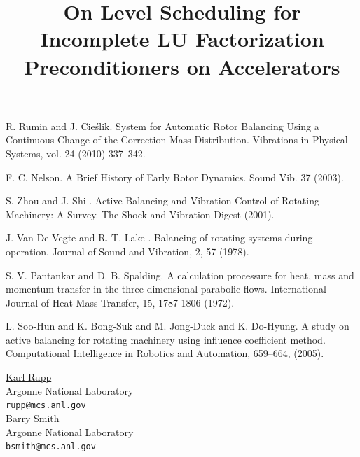 \documentclass[article, A4, 11pt]{llncs}%
\begin{document}


\begin{thebibliography}{10}
{\sc R. Rumin and J. Cieślik}. {System for Automatic Rotor Balancing Using a Continuous Change of the Correction Mass Distribution}. Vibrations in Physical Systems, vol. 24 (2010) 337–342.

{\sc F. C. Nelson}. {A Brief History of Early Rotor Dynamics}. Sound Vib. 37 (2003).

{\sc S. Zhou and J. Shi }. {Active Balancing and Vibration Control of Rotating Machinery: A Survey}. The Shock and Vibration Digest (2001).

{\sc  J. Van De Vegte and R. T. Lake }. {Balancing of rotating systems during operation}. Journal of Sound and Vibration, 2, 57 (1978).

{\sc S. V. Pantankar and D. B. Spalding}. {A calculation processure for heat, mass and momentum transfer in the three-dimensional parabolic flows}. International Journal of Heat Mass Transfer, 15, 1787-1806 (1972).

{\sc L. Soo-Hun and K. Bong-Suk and M. Jong-Duck and K. Do-Hyung}. {A study on active balancing for rotating machinery using influence coefficient method}. Computational Intelligence in Robotics and Automation, 659–664, (2005).
\end{thebibliography} %

\title{On Level Scheduling for Incomplete LU Factorization Preconditioners on Accelerators}
 \author{} \institute{}
\maketitle
\begin{center}
{\large \underline{Karl Rupp}}\\
Argonne National Laboratory\\
{\tt rupp@mcs.anl.gov}
\\ \vspace{4mm}
{\large Barry Smith}\\
Argonne National Laboratory\\
{\tt bsmith@mcs.anl.gov}
\end{center}
\end{document}
